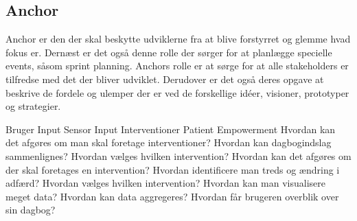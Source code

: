 \subsection{Anchor}
Anchor er den der skal beskytte udviklerne fra at blive forstyrret og glemme hvad fokus er.
Dernæst er det også denne rolle der sørger for at planlægge specielle events, såsom sprint planning.
Anchors rolle er at sørge for at alle stakeholders er tilfredse med det der bliver udviklet.
Derudover er det også deres opgave at beskrive de fordele og ulemper der er ved de forskellige idéer, visioner, prototyper og strategier.

\coord
  {Bruger Input}
  {Sensor Input}
  {Interventioner}
  {Patient Empowerment}
  {Hvordan kan det afgøres om man skal foretage interventioner?
    Hvordan kan dagbogindslag sammenlignes?
    Hvordan vælges hvilken intervention?}
  {Hvordan kan det afgøres om der skal foretages en intervention?
    Hvordan identificere man treds og ændring i adfærd?
    Hvordan vælges hvilken intervention?}
  {Hvordan kan man visualisere meget data?
    Hvordan kan data aggregeres?}
  {Hvordan får brugeren overblik over sin dagbog?}
